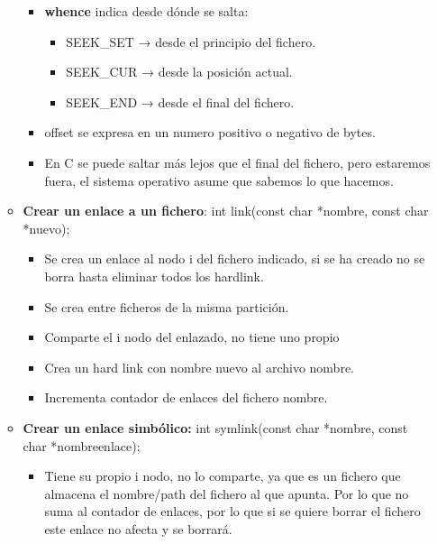 \documentclass[12pt, twoside, openright]{report} %
\begin{document}
\begin{itemize}
\begin{itemize}
\begin{itemize}
      \item \textbf{whence} indica desde dónde se salta:
        

        \begin{itemize}
        \item SEEK\_SET → desde el principio del fichero.
          
        \item SEEK\_CUR → desde la posición actual.
          
        \item SEEK\_END → desde el final del fichero.
          
        \end{itemize}
      \item offset se expresa en un numero positivo o negativo de bytes.
        
      \item En C se puede saltar más lejos que el final del fichero, pero
        estaremos fuera, el sistema operativo asume que sabemos lo que
        hacemos.
        
      \end{itemize}
    \item \textbf{Crear un enlace a un fichero}: int link(const char
      *nombre, const char *nuevo);
      

      \begin{itemize}
      \item Se crea un enlace al nodo i del fichero indicado, si se ha
        creado no se borra hasta eliminar todos los hardlink.
        
      \item Se crea entre ficheros de la misma partición.
        
      \item Comparte el i nodo del enlazado, no tiene uno propio
        
      \item Crea un hard link con nombre nuevo al archivo nombre.
        
      \item Incrementa contador de enlaces del fichero nombre.
        
      \end{itemize}
    \item \textbf{Crear un enlace simbólico:} int symlink(const char
      *nombre, const char *nombreenlace);
      

      \begin{itemize}
      \item Tiene su propio i nodo, no lo comparte, ya que es un fichero que
        almacena el nombre/path del fichero al que apunta. Por lo que no
        suma al contador de enlaces, por lo que si se quiere borrar el
        fichero este enlace no afecta y se borrará.
        

\end{itemize}
\end{itemize}
\end{itemize}
\end{document}
